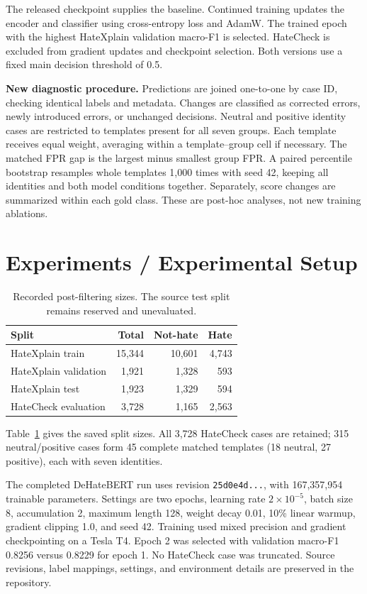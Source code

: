 \documentclass[11pt]{article}
\begin{document}
The released checkpoint supplies the baseline. Continued training updates the encoder and classifier using cross-entropy loss and AdamW. The trained epoch with the highest HateXplain validation macro-F1 is selected. HateCheck is excluded from gradient updates and checkpoint selection. Both versions use a fixed main decision threshold of 0.5.

\textbf{New diagnostic procedure.} Predictions are joined one-to-one by case ID, checking identical labels and metadata. Changes are classified as corrected errors, newly introduced errors, or unchanged decisions. Neutral and positive identity cases are restricted to templates present for all seven groups. Each template receives equal weight, averaging within a template--group cell if necessary. The matched FPR gap is the largest minus smallest group FPR. A paired percentile bootstrap resamples whole templates 1,000 times with seed 42, keeping all identities and both model conditions together. Separately, score changes are summarized within each gold class. These are post-hoc analyses, not new training ablations.

\section{Experiments / Experimental Setup}
\begin{table}[t]
\centering
\small
\begin{tabular}{lrrr}
\toprule
Split & Total & Not-hate & Hate \\
\midrule
HateXplain train & 15,344 & 10,601 & 4,743 \\
HateXplain validation & 1,921 & 1,328 & 593 \\
HateXplain test & 1,923 & 1,329 & 594 \\
HateCheck evaluation & 3,728 & 1,165 & 2,563 \\
\bottomrule
\end{tabular}
\caption{Recorded post-filtering sizes. The source test split remains reserved and unevaluated.}
\label{tab:data}
\end{table}
Table~\ref{tab:data} gives the saved split sizes. All 3,728 HateCheck cases are retained; 315 neutral/positive cases form 45 complete matched templates (18 neutral, 27 positive), each with seven identities.

The completed DeHateBERT run uses revision \texttt{25d0e4d...}, with 167,357,954 trainable parameters. Settings are two epochs, learning rate $2\times10^{-5}$, batch size 8, accumulation 2, maximum length 128, weight decay 0.01, 10\% linear warmup, gradient clipping 1.0, and seed 42. Training used mixed precision and gradient checkpointing on a Tesla T4. Epoch 2 was selected with validation macro-F1 0.8256 versus 0.8229 for epoch 1. No HateCheck case was truncated. Source revisions, label mappings, settings, and environment details are preserved in the repository.
\end{document}

